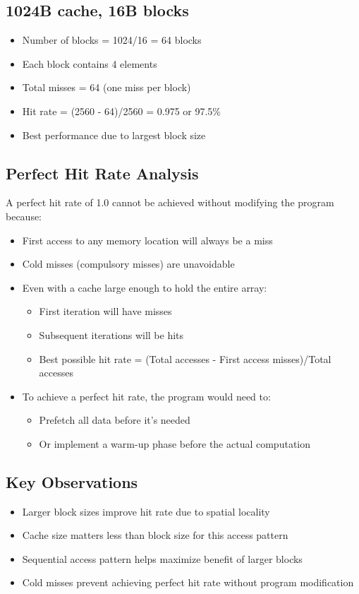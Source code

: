 \documentclass{article}
\begin{document}
\subsection{1024B cache, 16B blocks}
\begin{itemize}
    \item Number of blocks = 1024/16 = 64 blocks
    \item Each block contains 4 elements
    \item Total misses = 64 (one miss per block)
    \item Hit rate = (2560 - 64)/2560 = 0.975 or 97.5\%
    \item Best performance due to largest block size
\end{itemize}

\subsection{Perfect Hit Rate Analysis}
A perfect hit rate of 1.0 cannot be achieved without modifying the program because:
\begin{itemize}
    \item First access to any memory location will always be a miss
    \item Cold misses (compulsory misses) are unavoidable
    \item Even with a cache large enough to hold the entire array:
    \begin{itemize}
        \item First iteration will have misses
        \item Subsequent iterations will be hits
        \item Best possible hit rate = (Total accesses - First access misses)/Total accesses
    \end{itemize}
    \item To achieve a perfect hit rate, the program would need to:
    \begin{itemize}
        \item Prefetch all data before it's needed
        \item Or implement a warm-up phase before the actual computation
    \end{itemize}
\end{itemize}

\subsection{Key Observations}
\begin{itemize}
    \item Larger block sizes improve hit rate due to spatial locality
    \item Cache size matters less than block size for this access pattern
    \item Sequential access pattern helps maximize benefit of larger blocks
    \item Cold misses prevent achieving perfect hit rate without program modification
\end{itemize}
\end{document}
